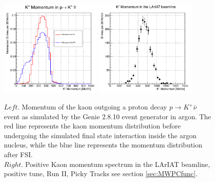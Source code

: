 \begin{figure}[hbpt]
\centering
\includegraphics[width=0.45\textwidth]{Chapter-2/Images/pdkGenie.png}	
\includegraphics[width=0.45\textwidth]{Chapter-2/Images/MomentumKaonsDatabeamline.png}
\caption{$Left$. Momentum of the kaon outgoing a proton decay $p\rightarrow K^+\bar\nu$ event as simulated by the Genie 2.8.10 event generator in argon. The red line represents the kaon momentum distribution before undergoing the simulated final state interaction inside the argon nucleus, while the blue line represents the momentum distribution after FSI.\\
$Right$. Positive Kaon momentum spectrum in the LArIAT beamline,  positive tune, Run II, Picky Tracks see section \ref{sec:MWPCfunc}. }
\label{fig:PDKGENIE}
\end{figure}


